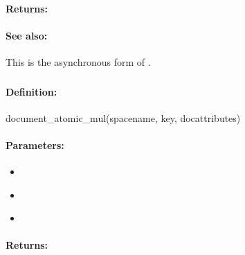 \paragraph{Returns:}


\paragraph{See also:}  This is the asynchronous form of .

\pagebreak
\subsubsection{}
\label{api:ruby:document_atomic_mul}


\paragraph{Definition:}
\begin{rubycode}
document_atomic_mul(spacename, key, docattributes)
\end{rubycode}

\paragraph{Parameters:}
\begin{itemize}[noitemsep]
\item {}\\

\item {}\\

\item {}\\

\end{itemize}

\paragraph{Returns:}


\pagebreak
\subsubsection{}
\label{api:ruby:async_document_atomic_mul}


